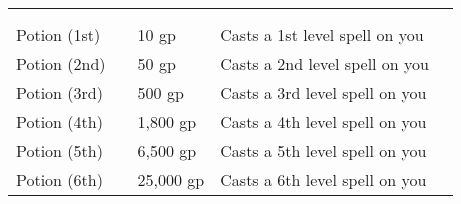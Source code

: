 
\begin{longtabuwrapper}
\begin{longtabu}{l l l X l}
 \\
 &  &  &  &  \\
\bottomrule
Potion (1st) &  & 10 gp & Casts a 1st level spell on you & \pageref{item:Potion (1st)} \\
Potion (2nd) &  & 50 gp & Casts a 2nd level spell on you & \pageref{item:Potion (2nd)} \\
Potion (3rd) &  & 500 gp & Casts a 3rd level spell on you & \pageref{item:Potion (3rd)} \\
Potion (4th) &  & 1,800 gp & Casts a 4th level spell on you & \pageref{item:Potion (4th)} \\
Potion (5th) &  & 6,500 gp & Casts a 5th level spell on you & \pageref{item:Potion (5th)} \\
Potion (6th) &  & 25,000 gp & Casts a 6th level spell on you & \pageref{item:Potion (6th)} \\
\end{longtabu}
\end{longtabuwrapper}
